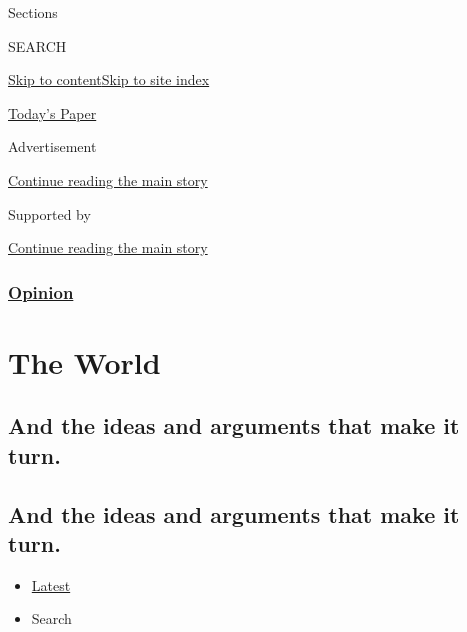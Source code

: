 Sections

SEARCH

\protect\hyperlink{site-content}{Skip to
content}\protect\hyperlink{site-index}{Skip to site index}

\href{https://myaccount.nytimes3xbfgragh.onion/auth/login?response_type=cookie\&client_id=vi}{}

\href{https://www.nytimes3xbfgragh.onion/section/todayspaper}{Today's
Paper}

Advertisement

\protect\hyperlink{after-top}{Continue reading the main story}

Supported by

\protect\hyperlink{after-sponsor}{Continue reading the main story}

\hypertarget{opinion}{%
\subsubsection{\texorpdfstring{\href{/section/opinion}{Opinion}}{Opinion}}\label{opinion}}

\hypertarget{the-world}{%
\section{The World}\label{the-world}}

\hypertarget{and-the-ideas-and-arguments-that-make-it-turn}{%
\subsection{And the ideas and arguments that make it
turn.}\label{and-the-ideas-and-arguments-that-make-it-turn}}

\hypertarget{and-the-ideas-and-arguments-that-make-it-turn-1}{%
\subsection{And the ideas and arguments that make it
turn.}\label{and-the-ideas-and-arguments-that-make-it-turn-1}}

\begin{itemize}
\tightlist
\item
  \protect\hyperlink{stream-panel}{Latest}
\item
  Search
\end{itemize}

